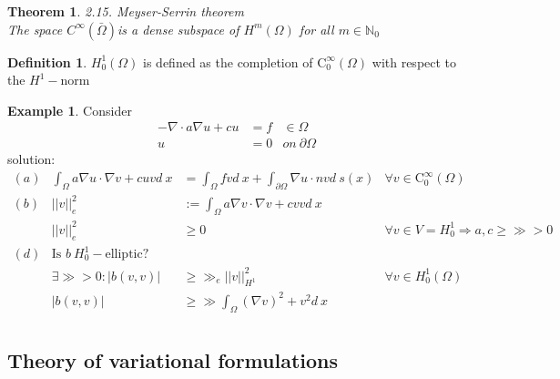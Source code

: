 \documentclass[english]{article}
\newtheorem*{theorem}{Theorem}
\theoremstyle{definition}
\newtheorem*{defi}{Definition}
\newtheorem*{exa}{Example}
\theoremstyle{remark}
\newcommand{\p}{\partial}
\newcommand{\NN}{\mathbb{N}}			%
\newcommand{\OO}{\Omega}
\newcommand{\cinf}{\tx{C}^\infty}
\newcommand{\drw}{\Rightarrow}			%
\newcommand{\tri}{\nabla}
\newcommand{\tx}[1]{\text{#1}}
\begin{document}
  \begin{theorem} 2.15. Meyser-Serrin theorem\\
    The space $C^\infty(\bar\OO)$is a dense subspace of $H^m(\OO)$ for all $m \in \NN_0$
  \end{theorem}
  \begin{defi}
    $H^1 _0 (\OO)$ is defined as the completion of $\cinf_0(\OO)$ with respect to the $H^1-$norm
  \end{defi}
  \begin{exa}
    Consider
    \begin{align*}
      -\tri \cdot a \tri u + cu & = f & \in \OO \\
      u                         & =0  & on\ \p\OO
    \end{align*}
    solution:
    \begin{align*}
      (a) & \int_\OO a \tri u \cdot \tri v + cuv d\ x & = \int_\OO fv d\ x + \int_{\p\OO} \tri u \cdot n v d\ s(x) & \forall v \in \cinf_0(\OO)                 \\
      (b) & ||v||_e ^2                                & := \int_\OO a \tri v \cdot \tri v + cvv d\ x                                                            \\
          & ||v||_e ^2                                & \geq 0                                                     & \forall v \in V=H_0 ^1 \drw a,c\geq \gg >0 \\
      (d) & \tx{Is }b \ H^1 _0-\tx{elliptic}?                                                                                                                   \\
          & \exists \gg>0:|b(v,v)|                    & \geq \gg_e||v||_{H^1}^2                                    & \forall v \in H_0 ^1(\OO)                  \\
          & |b(v,v)|                                  & \geq\gg\int_\OO (\tri v)^2 + v^2 d\ x                                                                   \\
    \end{align*}
  \end{exa}
  \subsection{Theory of variational formulations}
\end{document}
